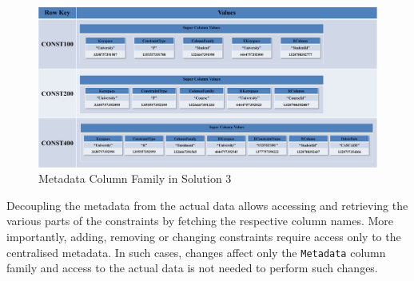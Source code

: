 \begin{landscape}
 	\begin{figure}[c] 
		\centering
		\includegraphics[width=1.45\textwidth]{./figure/Solutions/Sol3-MD-ColumnFamily.png}
		\caption{Metadata Column Family in Solution 3}\label{fd:Metadata-Solution3}
	\end{figure}
 	\end{landscape}
 	
Decoupling the metadata from the actual data allows accessing and retrieving the
various parts of the constraints by fetching  the respective column names. 
More importantly,   adding,  removing or changing constraints require  access only
to the centralised metadata.  In such cases,  changes affect only the
\texttt{Metadata} column family and access to the  actual data is not needed to
perform such changes. 









